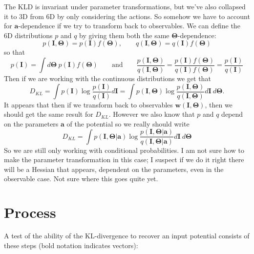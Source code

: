 \documentclass[useAMS,usenatbib,a4paper,referee]{mn2e}
\begin{document}
The KLD is invariant under parameter transformations, but we've also collapsed it to 3D from 6D by only considering the actions. So somehow we have to account for $\mathbf{a}$-dependence if we try to transform back to observables. We can define the 6D distributions $p$ and $q$ by giving them both the same $\mathbf{\Theta}$-dependence:
\begin{equation}
 p(\mathbf{I},\mathbf{\Theta}) = p(\mathbf{I})f(\mathbf{\Theta}), \qquad  q(\mathbf{I},\mathbf{\Theta}) = q(\mathbf{I})f(\mathbf{\Theta})
\end{equation} 
so that 
\begin{equation}
 p(\mathbf{I}) = \int d\mathbf{\Theta}\ p(\mathbf{I})f(\mathbf{\Theta}) \qquad \textrm{and} \qquad \frac{p(\mathbf{I},\mathbf{\Theta})}{q(\mathbf{I},\mathbf{\Theta})} = \frac{p(\mathbf{I})f(\mathbf{\Theta})}{q(\mathbf{I})f(\mathbf{\Theta})} = \frac{ p(\mathbf{I})}{q(\mathbf{I})}
\end{equation} 
Then if we are working with the continuous distributions we get that
\begin{equation}
 D_{KL} = \int p(\mathbf{I}) \log \frac{p(\mathbf{I})}{q(\mathbf{I})} d\mathbf{I} = \int p(\mathbf{I},\mathbf{\Theta}) \log \frac{p(\mathbf{I},\mathbf{\Theta})}{q(\mathbf{I},\mathbf{\Theta})} d\mathbf{I}\ d\mathbf{\Theta}.
\end{equation} 
It appears that then if we transform back to observables $\mathbf{w}(\mathbf{I},\mathbf{\Theta})$, then we should get the same result for $D_{KL}$. However we also know that $p$ and $q$ depend on the parameters $\mathbf{a}$ of the potential so we really should write
\begin{equation}
  D_{KL} =\int p(\mathbf{I},\mathbf{\Theta}|\mathbf{a}) \log \frac{p(\mathbf{I},\mathbf{\Theta}|\mathbf{a})}{q(\mathbf{I},\mathbf{\Theta}|\mathbf{a})} d\mathbf{I}\ d\mathbf{\Theta}
\end{equation} 
So we are still only working with conditional probabilities. I am not sure how to make the parameter transformation in this case; I suspect if we do it right there will be a Hessian that appears, dependent on the parameters, even in the observable case. Not sure where this goes quite yet.


\section{Process}
\label{sec:process}

A test of the ability of the KL-divergence to recover an input potential consists of these steps (bold notation indicates vectors):
\end{document}
